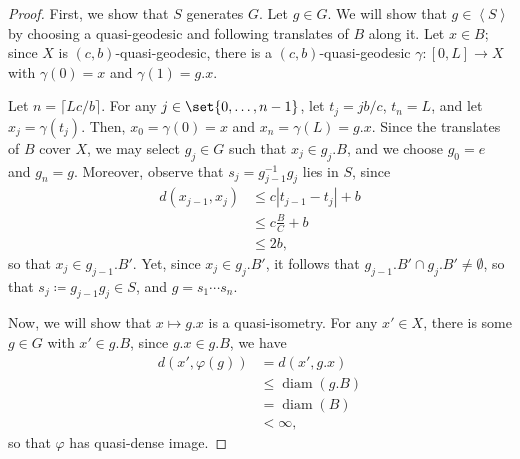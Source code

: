 \documentclass[10pt]{mypackage}
\renewcommand{\coloneq}{\coloneqq}
\begin{document}
\begin{proof}
  First, we show that $S$ generates $G$. Let $g\in G$. We will show that $g\in \left\langle S \right\rangle$ by choosing a quasi-geodesic and following translates of $B$ along it. Let $x\in B$; since $X$ is $\left( c,b \right)$-quasi-geodesic, there is a $\left( c,b \right)$-quasi-geodesic $\gamma\colon [0,L]\to X$ with $\gamma(0) = x$ and $\gamma(1) = g.x$.

  Let $n = \lceil Lc/b\rceil$. For any $j\in \set{0,\dots,n-1}$, let $t_j = jb/c$, $t_n = L$, and let $x_j = \gamma\left( t_j \right)$. Then, $x_0 = \gamma(0) = x$ and $x_n = \gamma(L) = g.x$. Since the translates of $B$ cover $X$, we may select $g_j\in G$ such that $x_j\in g_j.B$, and we choose $g_0 = e$ and $g_n = g$. Moreover, observe that $s_j = g_{j-1}^{-1}g_j$ lies in $S$, since
  \begin{align*}
    d\left( x_{j-1},x_j \right) &\leq c\left\vert t_{j-1}-t_j \right\vert + b \\
                                &\leq c\frac{B}{C} + b\\
                                &\leq 2b,
  \end{align*}
  so that $x_j\in g_{j-1}.B'$. Yet, since $x_{j}\in g_j.B'$, it follows that $g_{j-1}.B'\cap g_j.B'\neq \emptyset$, so that $s_j\coloneq g_{j-1}g_j\in S$, and $g = s_1\cdots s_n$.

  Now, we will show that $x\mapsto g.x$ is a quasi-isometry. For any $x'\in X$, there is some $g\in G$ with $x'\in g.B$, since $g.x\in g.B$, we have
  \begin{align*}
    d\left( x',\varphi(g) \right) &= d\left( x',g.x \right)\\
                                  &\leq \operatorname{diam}\left( g.B \right)\\
                                  &= \operatorname{diam}\left( B \right)\\
                                  &< \infty,
  \end{align*}
  so that $\varphi$ has quasi-dense image.


\end{proof}
\end{document}
